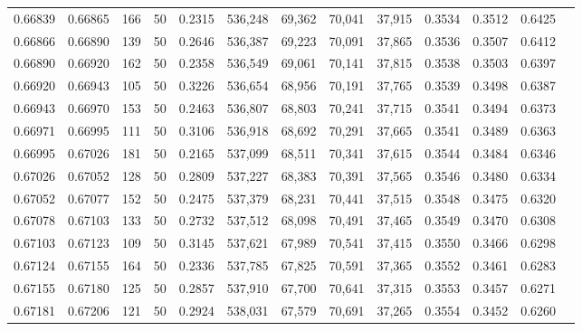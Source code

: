 \begin{tabular}{rrrrrrrrrrrrr}
0.66839 & 0.66865 &   166 &  50 &                                     0.2315 & 536,248 &  69,362 &  70,041 &  37,915 & 0.3534 & 0.3512 & 0.6425 \\
0.66866 & 0.66890 &   139 &  50 &                                     0.2646 & 536,387 &  69,223 &  70,091 &  37,865 & 0.3536 & 0.3507 & 0.6412 \\
0.66890 & 0.66920 &   162 &  50 &                                     0.2358 & 536,549 &  69,061 &  70,141 &  37,815 & 0.3538 & 0.3503 & 0.6397 \\
0.66920 & 0.66943 &   105 &  50 &                                     0.3226 & 536,654 &  68,956 &  70,191 &  37,765 & 0.3539 & 0.3498 & 0.6387 \\
0.66943 & 0.66970 &   153 &  50 &                                     0.2463 & 536,807 &  68,803 &  70,241 &  37,715 & 0.3541 & 0.3494 & 0.6373 \\
0.66971 & 0.66995 &   111 &  50 &                                     0.3106 & 536,918 &  68,692 &  70,291 &  37,665 & 0.3541 & 0.3489 & 0.6363 \\
0.66995 & 0.67026 &   181 &  50 &                                     0.2165 & 537,099 &  68,511 &  70,341 &  37,615 & 0.3544 & 0.3484 & 0.6346 \\
0.67026 & 0.67052 &   128 &  50 &                                     0.2809 & 537,227 &  68,383 &  70,391 &  37,565 & 0.3546 & 0.3480 & 0.6334 \\
0.67052 & 0.67077 &   152 &  50 &                                     0.2475 & 537,379 &  68,231 &  70,441 &  37,515 & 0.3548 & 0.3475 & 0.6320 \\
0.67078 & 0.67103 &   133 &  50 &                                     0.2732 & 537,512 &  68,098 &  70,491 &  37,465 & 0.3549 & 0.3470 & 0.6308 \\
0.67103 & 0.67123 &   109 &  50 &                                     0.3145 & 537,621 &  67,989 &  70,541 &  37,415 & 0.3550 & 0.3466 & 0.6298 \\
0.67124 & 0.67155 &   164 &  50 &                                     0.2336 & 537,785 &  67,825 &  70,591 &  37,365 & 0.3552 & 0.3461 & 0.6283 \\
0.67155 & 0.67180 &   125 &  50 &                                     0.2857 & 537,910 &  67,700 &  70,641 &  37,315 & 0.3553 & 0.3457 & 0.6271 \\
0.67181 & 0.67206 &   121 &  50 &                                     0.2924 & 538,031 &  67,579 &  70,691 &  37,265 & 0.3554 & 0.3452 & 0.6260 \\

\end{tabular}
